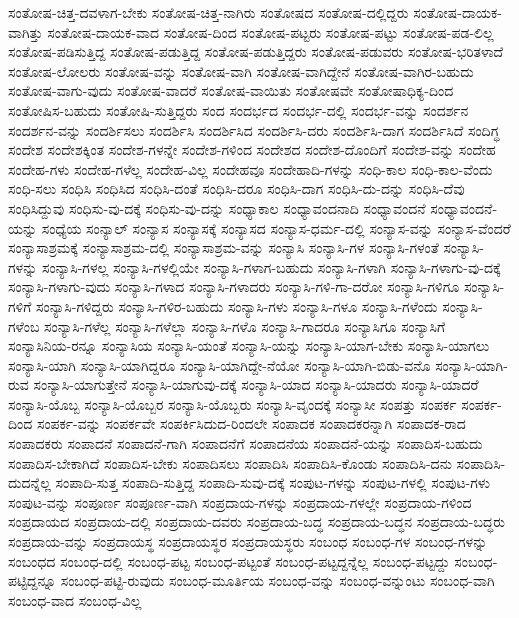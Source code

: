 {ಸಂತೋಷ-ಚಿತ್ತ-ದವಳಾಗ-ಬೇಕು
ಸಂತೋಷ-ಚಿತ್ತ-ನಾಗಿರು
ಸಂತೋಷದ
ಸಂತೋಷ-ದಲ್ಲಿದ್ದರು
ಸಂತೋಷ-ದಾಯಕ-ವಾಗಿತ್ತು
ಸಂತೋಷ-ದಾಯಕ-ವಾದ
ಸಂತೋಷ-ದಿಂದ
ಸಂತೋಷ-ಪಟ್ಟರು
ಸಂತೋಷ-ಪಟ್ಟು
ಸಂತೋಷ-ಪಡ-ಲಿಲ್ಲ
ಸಂತೋಷ-ಪಡಿಸುತ್ತಿದ್ದ
ಸಂತೋಷ-ಪಡುತ್ತಿದ್ದ
ಸಂತೋಷ-ಪಡುತ್ತಿದ್ದರು
ಸಂತೋಷ-ಪಡುವರು
ಸಂತೋಷ-ಭರಿತಳಾದೆ
ಸಂತೋಷ-ಲೋಲರು
ಸಂತೋಷ-ವನ್ನು
ಸಂತೋಷ-ವಾಗಿ
ಸಂತೋಷ-ವಾಗಿದ್ದೇನೆ
ಸಂತೋಷ-ವಾಗಿರ-ಬಹುದು
ಸಂತೋಷ-ವಾಗು-ವುದು
ಸಂತೋಷ-ವಾದರೆ
ಸಂತೋಷ-ವಾಯಿತು
ಸಂತೋಷವೇ
ಸಂತೋಷಾಧಿಕ್ಯ-ದಿಂದ
ಸಂತೋಷಿಸ-ಬಹುದು
ಸಂತೋಷಿ-ಸುತ್ತಿದ್ದರು
ಸಂದ
ಸಂದರ್ಭದ
ಸಂದರ್ಭ-ದಲ್ಲಿ
ಸಂದರ್ಭ-ವನ್ನು
ಸಂದರ್ಶನ
ಸಂದರ್ಶನ-ವನ್ನು
ಸಂದರ್ಶಿಸಲು
ಸಂದರ್ಶಿಸಿ
ಸಂದರ್ಶಿಸಿದ
ಸಂದರ್ಶಿಸಿ-ದರು
ಸಂದರ್ಶಿಸಿ-ದಾಗ
ಸಂದರ್ಶಿಸಿದೆ
ಸಂದಿಗ್ಧ
ಸಂದೇಶ
ಸಂದೇಶಕ್ಕಿಂತ
ಸಂದೇಶ-ಗಳನ್ನೇ
ಸಂದೇಶ-ಗಳಿಂದ
ಸಂದೇಶದ
ಸಂದೇಶ-ದೊಂದಿಗೆ
ಸಂದೇಶ-ವನ್ನು
ಸಂದೇಹ
ಸಂದೇಹ-ಗಳು
ಸಂದೇಹ-ಗಳೆಲ್ಲ
ಸಂದೇಹ-ವಿಲ್ಲ
ಸಂದೇಹವೂ
ಸಂದೇಹಾದಿ-ಗಳನ್ನು
ಸಂಧಿ-ಕಾಲ
ಸಂಧಿ-ಕಾಲ-ವೆಂದು
ಸಂಧಿ-ಸಲು
ಸಂಧಿಸಿ
ಸಂಧಿಸಿದ
ಸಂಧಿಸಿ-ದಂತೆ
ಸಂಧಿಸಿ-ದರೂ
ಸಂಧಿಸಿ-ದಾಗ
ಸಂಧಿಸಿ-ದು-ದನ್ನು
ಸಂಧಿಸಿ-ದೆವು
ಸಂಧಿಸಿದ್ದುವು
ಸಂಧಿಸು-ವು-ದಕ್ಕೆ
ಸಂಧಿಸು-ವು-ದನ್ನು
ಸಂಧ್ಯಾಕಾಲ
ಸಂಧ್ಯಾವಂದನಾದಿ
ಸಂಧ್ಯಾವಂದನೆ
ಸಂಧ್ಯಾವಂದನೆ-ಯನ್ನು
ಸಂಧ್ಯೆಯ
ಸಂನ್ಯಾಲ್
ಸಂನ್ಯಾಸ
ಸಂನ್ಯಾಸಕ್ಕೆ
ಸಂನ್ಯಾಸದ
ಸಂನ್ಯಾಸ-ಧರ್ಮ-ದಲ್ಲಿ
ಸಂನ್ಯಾಸ-ವನ್ನು
ಸಂನ್ಯಾಸ-ವೆಂದರೆ
ಸಂನ್ಯಾಸಾಶ್ರಮಕ್ಕೆ
ಸಂನ್ಯಾಸಾಶ್ರಮ-ದಲ್ಲಿ
ಸಂನ್ಯಾಸಾಶ್ರಮ-ವನ್ನು
ಸಂನ್ಯಾಸಿ
ಸಂನ್ಯಾಸಿ-ಗಳ
ಸಂನ್ಯಾಸಿ-ಗಳಂತೆ
ಸಂನ್ಯಾಸಿ-ಗಳನ್ನು
ಸಂನ್ಯಾಸಿ-ಗಳಲ್ಲ
ಸಂನ್ಯಾಸಿ-ಗಳಲ್ಲಿಯೇ
ಸಂನ್ಯಾಸಿ-ಗಳಾಗ-ಬಹುದು
ಸಂನ್ಯಾಸಿ-ಗಳಾಗಿ
ಸಂನ್ಯಾಸಿ-ಗಳಾಗು-ವು-ದಕ್ಕೆ
ಸಂನ್ಯಾಸಿ-ಗಳಾಗು-ವುದು
ಸಂನ್ಯಾಸಿ-ಗಳಾದ
ಸಂನ್ಯಾಸಿ-ಗಳಾದರು
ಸಂನ್ಯಾಸಿ-ಗಳಿ-ಗಾ-ದರೋ
ಸಂನ್ಯಾಸಿ-ಗಳಿಗೂ
ಸಂನ್ಯಾಸಿ-ಗಳಿಗೆ
ಸಂನ್ಯಾಸಿ-ಗಳಿದ್ದರು
ಸಂನ್ಯಾಸಿ-ಗಳಿರ-ಬಹುದು
ಸಂನ್ಯಾಸಿ-ಗಳು
ಸಂನ್ಯಾಸಿ-ಗಳೂ
ಸಂನ್ಯಾಸಿ-ಗಳೆಂದು
ಸಂನ್ಯಾಸಿ-ಗಳೆಂಬ
ಸಂನ್ಯಾಸಿ-ಗಳೆಲ್ಲ
ಸಂನ್ಯಾಸಿ-ಗಳೆಲ್ಲಾ
ಸಂನ್ಯಾಸಿ-ಗಳೊ
ಸಂನ್ಯಾಸಿ-ಗಾದರೂ
ಸಂನ್ಯಾಸಿಗೂ
ಸಂನ್ಯಾಸಿಗೆ
ಸಂನ್ಯಾಸಿನಿಯ-ರನ್ನೂ
ಸಂನ್ಯಾಸಿಯ
ಸಂನ್ಯಾಸಿ-ಯಂತೆ
ಸಂನ್ಯಾಸಿ-ಯನ್ನು
ಸಂನ್ಯಾಸಿ-ಯಾಗ-ಬೇಕು
ಸಂನ್ಯಾಸಿ-ಯಾಗಲು
ಸಂನ್ಯಾಸಿ-ಯಾಗಿ
ಸಂನ್ಯಾಸಿ-ಯಾಗಿದ್ದರೂ
ಸಂನ್ಯಾಸಿ-ಯಾಗಿದ್ದೇ-ನೆಯೋ
ಸಂನ್ಯಾಸಿ-ಯಾಗಿ-ಬಿಡು-ವನೊ
ಸಂನ್ಯಾಸಿ-ಯಾಗಿ-ರುವ
ಸಂನ್ಯಾಸಿ-ಯಾಗುತ್ತೇನೆ
ಸಂನ್ಯಾಸಿ-ಯಾಗುವು-ದಕ್ಕೆ
ಸಂನ್ಯಾಸಿ-ಯಾದ
ಸಂನ್ಯಾಸಿ-ಯಾದರು
ಸಂನ್ಯಾಸಿ-ಯಾದರೆ
ಸಂನ್ಯಾಸಿ-ಯೊಬ್ಬ
ಸಂನ್ಯಾಸಿ-ಯೊಬ್ಬರ
ಸಂನ್ಯಾಸಿ-ಯೊಬ್ಬರು
ಸಂನ್ಯಾಸಿ-ವೃಂದಕ್ಕೆ
ಸಂನ್ಯಾಸೀ
ಸಂಪತ್ತು
ಸಂಪರ್ಕ
ಸಂಪರ್ಕ-ದಿಂದ
ಸಂಪರ್ಕ-ವನ್ನು
ಸಂಪರ್ಕವೇ
ಸಂಪರ್ಕಿಸಿದುದ-ರಿಂದಲೇ
ಸಂಪಾದಕ
ಸಂಪಾದಕರನ್ನಾಗಿ
ಸಂಪಾದಕ-ರಾದ
ಸಂಪಾದಕರು
ಸಂಪಾದನೆ
ಸಂಪಾದನೆ-ಗಾಗಿ
ಸಂಪಾದನೆಗೆ
ಸಂಪಾದನೆಯ
ಸಂಪಾದನೆ-ಯನ್ನು
ಸಂಪಾದಿಸ-ಬಹುದು
ಸಂಪಾದಿಸ-ಬೇಕಾಗಿದೆ
ಸಂಪಾದಿಸ-ಬೇಕು
ಸಂಪಾದಿಸಲು
ಸಂಪಾದಿಸಿ
ಸಂಪಾದಿಸಿ-ಕೊಂಡು
ಸಂಪಾದಿಸಿ-ದನು
ಸಂಪಾದಿಸಿ-ದುದನ್ನೆಲ್ಲ
ಸಂಪಾದಿ-ಸುತ್ತ
ಸಂಪಾದಿ-ಸುತ್ತಿದ್ದ
ಸಂಪಾದಿ-ಸುವು-ದಕ್ಕೆ
ಸಂಪುಟ-ಗಳನ್ನು
ಸಂಪುಟ-ಗಳಲ್ಲಿ
ಸಂಪುಟ-ಗಳು
ಸಂಪುಟ-ವನ್ನು
ಸಂಪೂರ್ಣ
ಸಂಪೂರ್ಣ-ವಾಗಿ
ಸಂಪ್ರದಾಯ-ಗಳನ್ನು
ಸಂಪ್ರದಾಯ-ಗಳಲ್ಲೇ
ಸಂಪ್ರದಾಯ-ಗಳಿಂದ
ಸಂಪ್ರದಾಯದ
ಸಂಪ್ರದಾಯ-ದಲ್ಲಿ
ಸಂಪ್ರದಾಯ-ದವರು
ಸಂಪ್ರದಾಯ-ಬದ್ಧ
ಸಂಪ್ರದಾಯ-ಬದ್ಧನ
ಸಂಪ್ರದಾಯ-ಬದ್ಧರು
ಸಂಪ್ರದಾಯ-ವನ್ನು
ಸಂಪ್ರದಾಯಸ್ಥ
ಸಂಪ್ರದಾಯಸ್ಥರ
ಸಂಪ್ರದಾಯಸ್ಥರು
ಸಂಬಂಧ
ಸಂಬಂಧ-ಗಳ
ಸಂಬಂಧ-ಗಳನ್ನು
ಸಂಬಂಧದ
ಸಂಬಂಧ-ದಲ್ಲಿ
ಸಂಬಂಧ-ಪಟ್ಟ
ಸಂಬಂಧ-ಪಟ್ಟಂತೆ
ಸಂಬಂಧ-ಪಟ್ಟದ್ದನ್ನೆಲ್ಲ
ಸಂಬಂಧ-ಪಟ್ಟದ್ದು
ಸಂಬಂಧ-ಪಟ್ಟಿದ್ದನ್ನೂ
ಸಂಬಂಧ-ಪಟ್ಟಿ-ರುವುದು
ಸಂಬಂಧ-ಮೂರ್ತಿಯ
ಸಂಬಂಧ-ವನ್ನು
ಸಂಬಂಧ-ವನ್ನುಂಟು
ಸಂಬಂಧ-ವಾಗಿ
ಸಂಬಂಧ-ವಾದ
ಸಂಬಂಧ-ವಿಲ್ಲ
}

